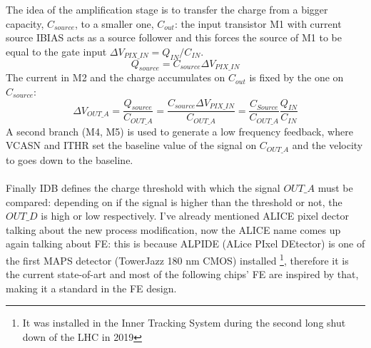         The idea of the amplification stage is to transfer the charge from a bigger capacity\cite{ALPIDE-FE}, $C_{source}$, to a smaller one, $C_{out}$: the input transistor M1 with current source IBIAS acts as a source follower and this forces the source of M1 to be equal to the gate input  $\Delta V_{PIX\_IN} = Q_{IN}/C_{IN}$.
        \begin{equation}
            Q_{source} = C_{source} \Delta V_{PIX\_IN}
        \end{equation}
        The current in M2 and the charge accumulates on $C_{out}$ is fixed by the one on $C_{source}$:
        \begin{equation}
            \Delta V_{OUT\_A} = \frac{Q_{source}}{C_{OUT\_A}} = \frac{C_{source}\Delta V_{PIX\_IN}}{C_{OUT\_A}}  = \frac{C_{Source}}{C_{OUT\_A}}\frac{Q_{IN}}{C_{IN}}
        \end{equation}
        A second branch (M4, M5) is used to generate a low frequency feedback, where VCASN and ITHR set the baseline value of the signal on $C_{OUT\_A}$ and the velocity to goes down to the baseline.\\
        \\
        Finally IDB defines the charge threshold with which the signal $OUT\_A$ must be compared: depending on if the signal is higher than the threshold or not, the $OUT\_D$ is high or low respectively.
        I've already mentioned ALICE pixel dector talking about the new process modification, now the ALICE name comes up again talking about FE: this is because ALPIDE (ALice PIxel DEtector) is one of the first MAPS detector (TowerJazz 180 nm CMOS) installed \footnote{It was installed in the Inner Tracking System during the second long shut down of the LHC in 2019}, therefore it is the current state-of-art and most of the following chips' FE are inspired by that, making it a standard in the FE design.
            
